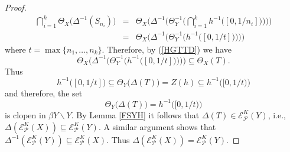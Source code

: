 \documentclass{amsart}
\theoremstyle{definition}
\theoremstyle{remark}
\theoremstyle{notation}
\numberwithin{equation}{section}
\begin{document}
\begin{proof}
\begin{eqnarray*}
\bigcap_{i=1}^k\Theta_X\big(\Delta^{-1}(S_{n_i})\big)&=&\Theta_X\Big(\Delta^{-1}\Big(\Theta_Y^{-1}\Big(\bigcap_{i=1}^k  h^{-1}\big([0,1/n_i]\big)\Big)\Big)\Big)
\\&=&\Theta_X\big(\Delta^{-1}\big(\Theta_Y^{-1}\big(h^{-1}\big([0,1/t]\big)\big)\big)\big)
\end{eqnarray*}
where $t=\max\{n_1,\ldots,n_k\}$. Therefore, by (\ref{HGTTD}) we have
\[\Theta_X\big(\Delta^{-1}\big(\Theta_Y^{-1}\big(h^{-1}\big([0,1/t]\big)\big)\big)\big)\subseteq\Theta_X(T).\]
Thus
\[h^{-1}\big([0,1/t]\big)\subseteq\Theta_Y\big(\Delta(T)\big)=Z(h)\subseteq h^{-1}\big([0,1/t)\big)\]
and therefore, the set
\[\Theta_Y\big(\Delta(T)\big)= h^{-1}\big([0,1/t)\big)\]
is clopen in $\beta Y\backslash Y$. By Lemma \ref{FSYH}  it follows that $\Delta(T)\in {\mathscr E}^K_{{\mathcal P}}(Y)$, i.e.,
$\Delta({\mathscr E}^K_{{\mathcal P}}(X))\subseteq {\mathscr E}^K_{{\mathcal P}}(Y)$.
A similar argument shows that $\Delta^{-1}({\mathscr E}^K_{{\mathcal P}}(Y))\subseteq {\mathscr E}^K_{{\mathcal P}}(X)$. Thus
$\Delta({\mathscr E}^K_{{\mathcal P}}(X))={\mathscr E}^K_{{\mathcal P}}(Y)$.


\end{proof}
\end{document}
